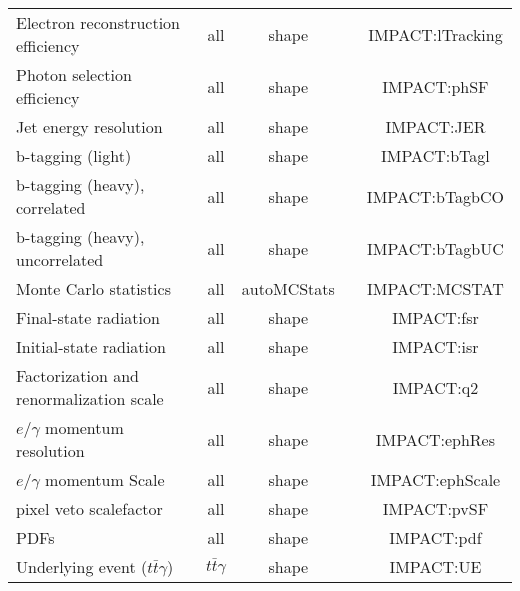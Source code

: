 \begin{table}
\begin{tabular}{l|c|c|c|c}
      Electron reconstruction efficiency                  & all                   & shape             &                     & IMPACT:lTracking  \\
      Photon selection efficiency                         & all                   & shape             &                     & IMPACT:phSF  \\
      Jet energy resolution                               & all                   & shape             &                     & IMPACT:JER  \\
      b-tagging (light)                                   & all                   & shape             &                     & IMPACT:bTagl  \\
      b-tagging (heavy), correlated                       & all                   & shape             &                     & IMPACT:bTagbCO  \\
      b-tagging (heavy), uncorrelated                     & all                   & shape             &                     & IMPACT:bTagbUC  \\
      Monte Carlo statistics                              & all                   & autoMCStats       &                     & IMPACT:MCSTAT  \\
      Final-state radiation                               & all                   & shape             &                     & IMPACT:fsr  \\
      Initial-state radiation                             & all                   & shape             &                     & IMPACT:isr  \\
      Factorization and renormalization scale             & all                   & shape             &                     & IMPACT:q2  \\
      $e/\gamma$ momentum resolution                      & all                   & shape             &                     & IMPACT:ephRes  \\
      $e/\gamma$ momentum Scale                           & all                   & shape             &                     & IMPACT:ephScale  \\
      pixel veto scalefactor                              & all                   & shape             &                     & IMPACT:pvSF  \\
      PDFs                                                & all                   & shape             &                     & IMPACT:pdf  \\
      Underlying event ($t\bar{t}\gamma$)                 & $t\bar{t}\gamma$      & shape             &                     & IMPACT:UE  \\

\end{tabular}
\end{table}

